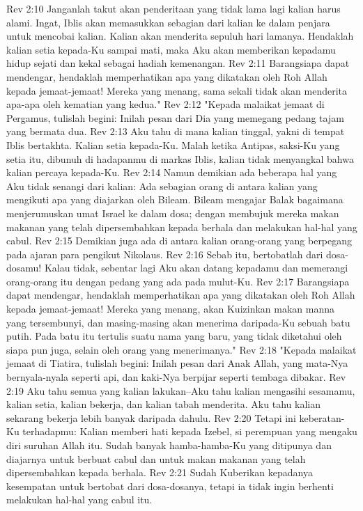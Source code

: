Rev 2:10  Janganlah takut akan penderitaan yang tidak lama lagi kalian harus alami. Ingat, Iblis akan memasukkan sebagian dari kalian ke dalam penjara untuk mencobai kalian. Kalian akan menderita sepuluh hari lamanya. Hendaklah kalian setia kepada-Ku sampai mati, maka Aku akan memberikan kepadamu hidup sejati dan kekal sebagai hadiah kemenangan.
Rev 2:11  Barangsiapa dapat mendengar, hendaklah memperhatikan apa yang dikatakan oleh Roh Allah kepada jemaat-jemaat! Mereka yang menang, sama sekali tidak akan menderita apa-apa oleh kematian yang kedua."
Rev 2:12  "Kepada malaikat jemaat di Pergamus, tulislah begini: Inilah pesan dari Dia yang memegang pedang tajam yang bermata dua.
Rev 2:13  Aku tahu di mana kalian tinggal, yakni di tempat Iblis bertakhta. Kalian setia kepada-Ku. Malah ketika Antipas, saksi-Ku yang setia itu, dibunuh di hadapanmu di markas Iblis, kalian tidak menyangkal bahwa kalian percaya kepada-Ku.
Rev 2:14  Namun demikian ada beberapa hal yang Aku tidak senangi dari kalian: Ada sebagian orang di antara kalian yang mengikuti apa yang diajarkan oleh Bileam. Bileam mengajar Balak bagaimana menjerumuskan umat Israel ke dalam dosa; dengan membujuk mereka makan makanan yang telah dipersembahkan kepada berhala dan melakukan hal-hal yang cabul.
Rev 2:15  Demikian juga ada di antara kalian orang-orang yang berpegang pada ajaran para pengikut Nikolaus.
Rev 2:16  Sebab itu, bertobatlah dari dosa-dosamu! Kalau tidak, sebentar lagi Aku akan datang kepadamu dan memerangi orang-orang itu dengan pedang yang ada pada mulut-Ku.
Rev 2:17  Barangsiapa dapat mendengar, hendaklah memperhatikan apa yang dikatakan oleh Roh Allah kepada jemaat-jemaat! Mereka yang menang, akan Kuizinkan makan manna yang tersembunyi, dan masing-masing akan menerima daripada-Ku sebuah batu putih. Pada batu itu tertulis suatu nama yang baru, yang tidak diketahui oleh siapa pun juga, selain oleh orang yang menerimanya."
Rev 2:18  "Kepada malaikat jemaat di Tiatira, tulislah begini: Inilah pesan dari Anak Allah, yang mata-Nya bernyala-nyala seperti api, dan kaki-Nya berpijar seperti tembaga dibakar.
Rev 2:19  Aku tahu semua yang kalian lakukan--Aku tahu kalian mengasihi sesamamu, kalian setia, kalian bekerja, dan kalian tabah menderita. Aku tahu kalian sekarang bekerja lebih banyak daripada dahulu.
Rev 2:20  Tetapi ini keberatan-Ku terhadapmu: Kalian memberi hati kepada Izebel, si perempuan yang mengaku diri suruhan Allah itu. Sudah banyak hamba-hamba-Ku yang ditipunya dan diajarnya untuk berbuat cabul dan untuk makan makanan yang telah dipersembahkan kepada berhala.
Rev 2:21  Sudah Kuberikan kepadanya kesempatan untuk bertobat dari dosa-dosanya, tetapi ia tidak ingin berhenti melakukan hal-hal yang cabul itu.
